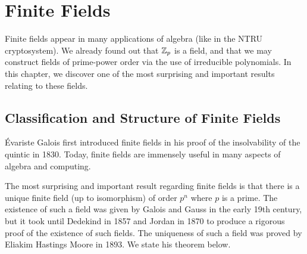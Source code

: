 \chapter{Finite Fields}
Finite fields appear in many applications of algebra (like in the NTRU cryptosystem). We already found out that $\mathbb{Z}_p$ is a field, and that we may construct fields of prime-power order via the use of irreducible polynomials. In this chapter, we discover one of the most surprising and important results relating to these fields.

\section{Classification and Structure of Finite Fields}
\'Evariste Galois first introduced finite fields in his proof of the insolvability of the quintic in 1830. Today, finite fields are immensely useful in many aspects of algebra and computing.

The most surprising and important result regarding finite fields is that there is a unique finite field (up to isomorphism) of order $p^n$ where $p$ is a prime. The existence of such a field was given by Galois and Gauss in the early 19th century, but it took until Dedekind in 1857 and Jordan in 1870 to produce a rigorous proof of the existence of such fields. The uniqueness of such a field was proved by Eliakim Hastings Moore in 1893. We state his theorem below.

